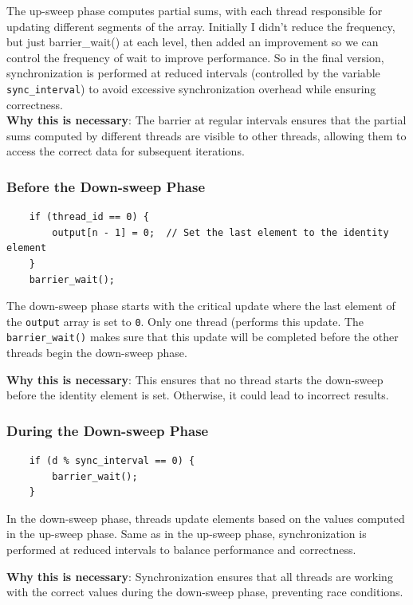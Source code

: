 \documentclass[letterpaper,12pt]{article}
\theoremstyle{remark}
\begin{document}
The up-sweep phase computes partial sums, with each thread responsible for updating different segments of the array. Initially I didn't reduce the frequency, but just barrier\_wait() at each level, then added an improvement so we can control the frequency of wait to improve performance. So in the final version, synchronization is performed at reduced intervals (controlled by the variable \texttt{sync\_interval}) to avoid excessive synchronization overhead while ensuring correctness.\\
\textbf{Why this is necessary}: The barrier at regular intervals ensures that the partial sums computed by different threads are visible to other threads, allowing them to access the correct data for subsequent iterations.

\subsubsection{Before the Down-sweep Phase}
\begin{verbatim}
    if (thread_id == 0) {
        output[n - 1] = 0;  // Set the last element to the identity element
    }
    barrier_wait();
\end{verbatim}

The down-sweep phase starts with the critical update where the last element of the \texttt{output} array is set to \texttt{0}. Only one thread (performs this update. The \texttt{barrier\_wait()} makes sure that this update will be completed before the other threads begin the down-sweep phase.

\textbf{Why this is necessary}: This ensures that no thread starts the down-sweep before the identity element is set. Otherwise, it could lead to incorrect results.

\subsubsection{During the Down-sweep Phase}
\begin{verbatim}
    if (d % sync_interval == 0) {
        barrier_wait();
    }
\end{verbatim}

In the down-sweep phase, threads update elements based on the values computed in the up-sweep phase. Same as in the up-sweep phase, synchronization is performed at reduced intervals to balance performance and correctness.

\textbf{Why this is necessary}: Synchronization ensures that all threads are working with the correct values during the down-sweep phase, preventing race conditions.
\end{document}
